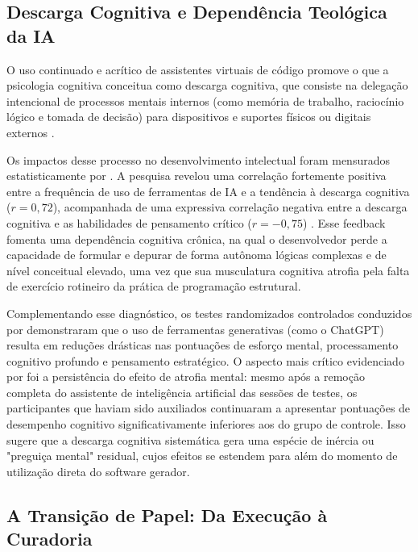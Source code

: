 \subsection{Descarga Cognitiva e Dependência Teológica da IA}

O uso continuado e acrítico de assistentes virtuais de código promove o que a psicologia cognitiva conceitua como descarga cognitiva, que consiste na delegação intencional de processos mentais internos (como memória de trabalho, raciocínio lógico e tomada de decisão) para dispositivos e suportes físicos ou digitais externos \cite{gerlich2025, georgiou2025}. 

Os impactos desse processo no desenvolvimento intelectual foram mensurados estatisticamente por . A pesquisa revelou uma correlação fortemente positiva entre a frequência de uso de ferramentas de IA e a tendência à descarga cognitiva ($r = 0,72$), acompanhada de uma expressiva correlação negativa entre a descarga cognitiva e as habilidades de pensamento crítico ($r = -0,75$) \cite{gerlich2025}. Esse feedback fomenta uma dependência cognitiva crônica, na qual o desenvolvedor perde a capacidade de formular e depurar de forma autônoma lógicas complexas e de nível conceitual elevado, uma vez que sua musculatura cognitiva atrofia pela falta de exercício rotineiro da prática de programação estrutural.

Complementando esse diagnóstico, os testes randomizados controlados conduzidos por  demonstraram que o uso de ferramentas generativas (como o ChatGPT) resulta em reduções drásticas nas pontuações de esforço mental, processamento cognitivo profundo e pensamento estratégico. O aspecto mais crítico evidenciado por  foi a persistência do efeito de atrofia mental: mesmo após a remoção completa do assistente de inteligência artificial das sessões de testes, os participantes que haviam sido auxiliados continuaram a apresentar pontuações de desempenho cognitivo significativamente inferiores aos do grupo de controle. Isso sugere que a descarga cognitiva sistemática gera uma espécie de inércia ou "preguiça mental"  residual, cujos efeitos se estendem para além do momento de utilização direta do software gerador.

\subsection{A Transição de Papel: Da Execução à Curadoria}

